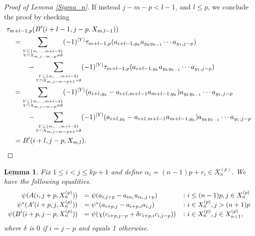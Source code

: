 \documentclass[11pt]{amsart}
\def\a{\alpha}
\newtheorem{lem}[thm]{Lemma}
\theoremstyle{definition}
\begin{document}
\begin{proof} [Proof of Lemma \ref{Sigma_n}]
If instead $j-m-p <l - 1$, and $l\le p$, we conclude the proof by checking
{\small
\begin{align*}
&\tau_{m + l - 1,p}(B'(i+l-1,j-p,X_{m,l-1})) \\
&\quad = \sum_{{\scriptscriptstyle \overset{Y\subseteq \{m,\ldots,m+l-2\}}{Y\cap X_{m,j-m-p}\ne\emptyset}}}(-1)^{|Y|}\tau_{m + l - 1,p}(a_{i+l-1,y_k}a_{y_ky_{k-1}}\cdots a_{y_1,j-p}) \\
&\qquad\quad - \sum_{{\scriptscriptstyle \overset{Y\subseteq \{m,\ldots,m+l-2\}}{Y\cap X_{m,j-m-p+1}=\emptyset}}}(-1)^{|Y|}\tau_{m + l - 1,p}(a_{i+l-1,y_k}a_{y_ky_{k-1}}\cdots a_{y_1,j-p}) \\
&\quad = \sum_{{\scriptscriptstyle \overset{Y\subseteq \{m,\ldots,m+l-2\}}{Y\cap X_{m,j-m-p}\ne\emptyset}}}(-1)^{|Y|}(a_{i+l,y_k} - a_{i+l,m+l-1}a_{m+l-1,y_k})a_{y_ky_{k-1}}\cdots a_{y_1,j-p} \\
&\qquad\quad - \sum_{{\scriptscriptstyle \overset{Y\subseteq \{m,\ldots,m+l-2\}}{Y\cap X_{m,j-m-p+1}=\emptyset}}}(-1)^{|Y|}(a_{i+l,y_k} - a_{i+l,m+l-1}a_{m+l-1,y_k})a_{y_ky_{k-1}}\cdots a_{y_1,j-p} \\
&\quad = B'(i+l,j-p,X_{m,l}). \qedhere
\end{align*}
}
\end{proof}


\begin{lem}\label{SimplifiedImages}
Fix $1\le i< j\le kp+1$ and define $\a_i = (n-1)p+r_i\in X_n^{(p)}$. We have the following equalities.
  \[\begin{array}{r l l} \psi(A(i,j+p,X_n^{(p)}))   &= \psi(a_{i,j+p} - a_{i\a_i}a_{\a_i,j+p})      & \colon i\le(n-1)p, j\in X_n^{(p)}\\
                  \psi^*(A'(i+p,j,X_n^{(p)})) &= \psi^*(a_{i+p,j} - a_{i+p,i}a_{i,j})       & \colon i\in X_n^{(p)}, j>(n+1)p\\
                \psi(B'(i+p,j-p,X_n^{(p)})) &= \psi(\chi(c_{i+p,j-p} + \delta c_{i+p,i}c_{i,j-p})) & \colon i\in X_n^{(p)}, j\in X_{n+1}^{(p)},
  \end{array}\]
\noindent where $\delta$ is $0$ if $i=j-p$ and equals 1 otherwise.
\end{lem}
\end{document}
